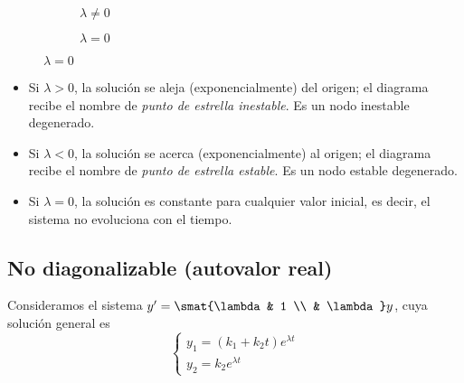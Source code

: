 \documentclass[../main.tex]{subfiles}
\begin{document}
\begin{figure}[ht]
  \centering
  \begin{subfigure}{0.5\textwidth}
    \centering
    \caption*{\(\lambda \neq 0\)}
  \end{subfigure}%
  \begin{subfigure}{0.5\textwidth}
    \centering
    \caption*{\(\lambda = 0\)}
  \end{subfigure}
\end{figure}

\begin{itemize}
\item Si \(\lambda > 0\), la solución se aleja (exponencialmente) del origen; el
  diagrama recibe el nombre de \emph{punto de estrella inestable}. Es un nodo
  inestable degenerado.
\item Si \(\lambda < 0\), la solución se acerca (exponencialmente) al origen; el
  diagrama recibe el nombre de \emph{punto de estrella estable}. Es un nodo
  estable degenerado.
\item Si \(\lambda = 0\), la solución es constante para cualquier valor inicial,
  es decir, el sistema no evoluciona con el tiempo.
\end{itemize}

\subsection{No diagonalizable (autovalor real)}
Consideramos el sistema \(y' = \smat{\lambda & 1 \\ & \lambda}y\), cuya solución
general es
\[
  \begin{cases}
    y_1 = (k_1+k_2t)e^{\lambda t} \\
    y_2 = k_2e^{\lambda t}
  \end{cases}
\]
\end{document}
